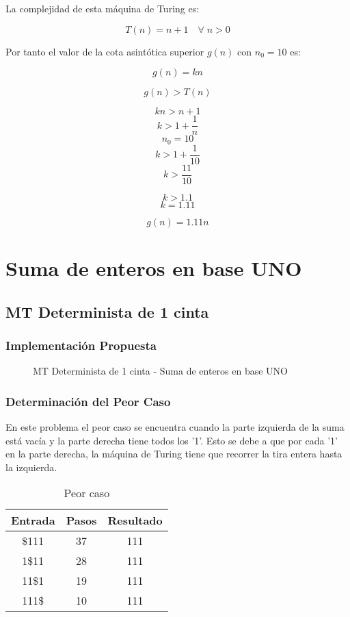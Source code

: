 \documentclass{uc3mpracticas}
\begin{document}
    La complejidad de esta máquina de Turing es:

    $$ T(n) = n + 1 \quad \forall \; n>0 $$

    Por tanto el valor de la cota asintótica superior $g(n)$ con $n_0 = 10$ es:

    $$ g(n) = kn $$

    $$ g(n) > T(n) $$

    $$ kn > n + 1 $$
    $$ k > 1 + \frac{1}{n} $$
    $$ n_0 = 10 $$
    $$ k > 1 + \frac{1}{10} $$
    $$ k > \frac{11}{10} $$

    $$ k > 1.1 $$
    $$ k = 1.11 $$

    $$ g(n) = 1.11n $$


  \newpage
  \section{Suma de enteros en base UNO}



  \subsection{MT Determinista de 1 cinta}

  \subsubsection{Implementación Propuesta}

  \begin{figure}[!h]
    \caption{MT Determinista de 1 cinta - Suma de enteros en base UNO}
  \end{figure}


  \subsubsection{Determinación del Peor Caso}

  En este problema el peor caso se encuentra cuando la parte izquierda de la suma está vacía y la parte derecha tiene todos los '1'. Esto se debe a que por cada '1' en la parte derecha, la máquina de Turing tiene que recorrer la tira entera hasta la izquierda.

  \begin{table}[!h]
    \centering
  \begin{tabular}{|c|c|c|}
  \hline
  \textbf{Entrada} & \textbf{Pasos} & \textbf{Resultado} \\ \hline
  \$111            & 37             & 111              \\ \hline
  1\$11            & 28             & 111              \\ \hline
  11\$1            & 19             & 111              \\ \hline
  111\$            & 10             & 111              \\ \hline
  \end{tabular}
  \caption{Peor caso}
  \end{table}
\end{document}
